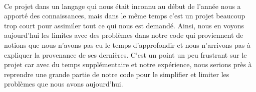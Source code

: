 \documentclass{article}
\begin{document}
\paragraph{}Ce projet dans un langage qui nous était inconnu au début de l'année nous a apporté des connaissances, mais dans le même temps c'est un projet beaucoup trop court pour assimiler tout ce qui nous est demandé. Ainsi, nous en voyons aujourd'hui les limites avec des problèmes dans notre code qui proviennent de notions que nous n'avons pas eu le temps d'approfondir et nous n'arrivons pas à expliquer la provenance de ses dernières. C'est un point un peu frustrant sur le projet car avec du temps supplémentaire et notre expérience, nous serions près à reprendre une grande partie de notre code pour le simplifier et limiter les problèmes que nous avons aujourd'hui.


\newpage
\end{document}
